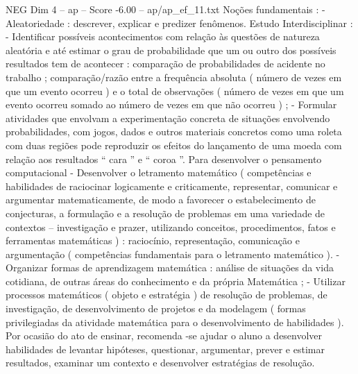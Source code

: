 \begin{textsample}{NEG Dim 4 – ap – Score -6.00 – ap/ap\_ef\_11.txt}
Noções fundamentais : - Aleatoriedade : descrever, explicar e predizer fenômenos.
Estudo Interdisciplinar : - Identificar possíveis acontecimentos com relação às questões de natureza aleatória e até estimar o grau de probabilidade que um ou outro dos possíveis resultados tem de acontecer : comparação de probabilidades de acidente no trabalho ; comparação/razão entre a frequência absoluta ( número de vezes em que um evento ocorreu ) e o total de observações ( número de vezes em que um evento ocorreu somado ao número de vezes em que não ocorreu ) ; - Formular atividades que envolvam a experimentação concreta de situações envolvendo probabilidades, com jogos, dados e outros materiais concretos como uma roleta com duas regiões pode reproduzir os efeitos do lançamento de uma moeda com relação aos resultados “ cara ” e “ coroa ”.
Para desenvolver o pensamento computacional - Desenvolver o letramento matemático ( competências e habilidades de raciocinar logicamente e criticamente, representar, comunicar e argumentar matematicamente, de modo a favorecer o estabelecimento de conjecturas, a formulação e a resolução de problemas em uma variedade de contextos – investigação e prazer, utilizando conceitos, procedimentos, fatos e ferramentas matemáticas ) : raciocínio, representação, comunicação e argumentação ( competências fundamentais para o letramento matemático ). - Organizar formas de aprendizagem matemática : análise de situações da vida cotidiana, de outras áreas do conhecimento e da própria Matemática ; - Utilizar processos matemáticos ( objeto e estratégia ) de resolução de problemas, de investigação, de desenvolvimento de projetos e da modelagem ( formas privilegiadas da atividade matemática para o desenvolvimento de habilidades ).
Por ocasião do ato de ensinar, recomenda -se ajudar o aluno a desenvolver habilidades de levantar hipóteses, questionar, argumentar, prever e estimar resultados, examinar um contexto e desenvolver estratégias de resolução.

\end{textsample}
